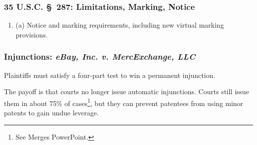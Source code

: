\subsubsection{35 U.S.C. \S\ 287: Limitations, Marking, Notice}

\begin{enumerate}
    \item (a) Notice and marking requirements, including new virtual marking 
    provisions.
\end{enumerate}

\subsubsection{Injunctions: \emph{eBay, Inc. v. MercExchange, LLC}}

Plaintiffs must satisfy a four-part test to win a permanent injunction.

The payoff is that courts no longer issue automatic injunctions. Courts still 
issue them in about 75\% of cases\footnote{See Merges PowerPoint.}, but they 
can prevent patentees from using minor patents to gain undue leverage.

